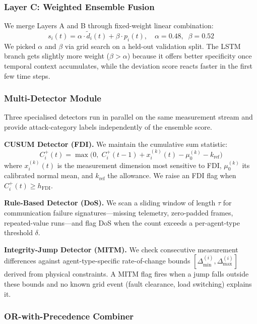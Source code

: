 \documentclass[conference]{IEEEtran}
\begin{document}
\subsubsection{Layer C: Weighted Ensemble Fusion}

We merge Layers A and B through fixed-weight linear combination:
\begin{equation}
s_i(t) = \alpha \cdot \tilde{d}_i(t) + \beta \cdot p_i(t), \quad \alpha = 0.48,\;\; \beta = 0.52
\label{eq:ensemble}
\end{equation}
We picked $\alpha$ and $\beta$ via grid search on a held-out validation split. The LSTM branch gets slightly more weight ($\beta > \alpha$) because it offers better specificity once temporal context accumulates, while the deviation score reacts faster in the first few time steps.

\subsubsection{Multi-Detector Module}

Three specialised detectors run in parallel on the same measurement stream and provide attack-category labels independently of the ensemble score.

\textbf{CUSUM Detector (FDI).} We maintain the cumulative sum statistic:
\begin{equation}
C_i^+(t) = \max\!\bigl(0,\; C_i^+(t{-}1) + x_i^{(k)}(t) - \mu_0^{(k)} - k_{\text{ref}}\bigr)
\label{eq:cusum}
\end{equation}
where $x_i^{(k)}(t)$ is the measurement dimension most sensitive to FDI, $\mu_0^{(k)}$ its calibrated normal mean, and $k_{\text{ref}}$ the allowance. We raise an FDI flag when $C_i^+(t) \geq h_{\text{FDI}}$.

\textbf{Rule-Based Detector (DoS).} We scan a sliding window of length $\tau$ for communication failure signatures---missing telemetry, zero-padded frames, repeated-value runs---and flag DoS when the count exceeds a per-agent-type threshold $\delta$.

\textbf{Integrity-Jump Detector (MITM).} We check consecutive measurement differences against agent-type-specific rate-of-change bounds $[\Delta_{\min}^{(i)}, \Delta_{\max}^{(i)}]$ derived from physical constraints. A MITM flag fires when a jump falls outside these bounds and no known grid event (fault clearance, load switching) explains it.

\subsubsection{OR-with-Precedence Combiner}
\end{document}
